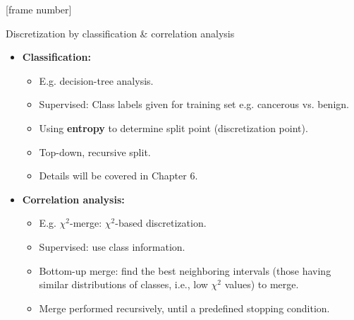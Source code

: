 \documentclass[aspectratio=169,t]{beamer}
\begin{document}
  {
    [frame number]
    \begin{frame}{Discretization by classification \& correlation analysis}
        \begin{itemize}
            \item \textbf{Classification:}
            \begin{itemize}
              \item E.g. decision-tree analysis.
              \item Supervised: Class labels given for training set e.g. cancerous vs. benign.
              \item Using \textbf{entropy} to determine split point (discretization point).
              \item Top-down, recursive split.
              \item Details will be covered in Chapter 6.
            \end{itemize}
            \item \textbf{Correlation analysis:}
            \begin{itemize}
              \item E.g. $\chi^2$-merge: $\chi^2$-based discretization.
              \item Supervised: use class information.
              \item Bottom-up merge: find the best neighboring intervals (those having similar distributions of classes, i.e., low $\chi^2$ values) to merge.
              \item Merge performed recursively, until a predefined stopping condition.
            \end{itemize}
        \end{itemize}
    \end{frame}
  }
\end{document}
